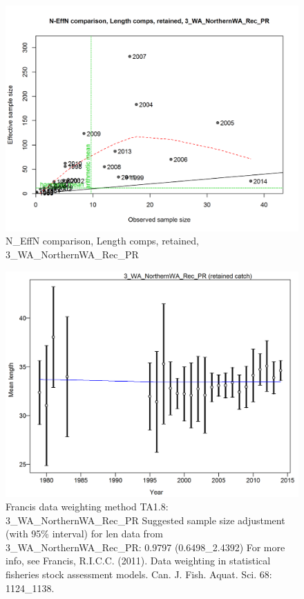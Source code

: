 \documentclass[12pt,]{article}
\begin{document}
\begin{figure}[htbp]
\centering
\includegraphics{./r4ss/plots_mod1/comp_lenfit_sampsize_flt3mkt2.png}
\caption{N\_EffN comparison, Length comps, retained,
3\_WA\_NorthernWA\_Rec\_PR
\label{fig:mod1_7_comp_lenfit_sampsize_flt3mkt2}}
\end{figure}

\begin{figure}[htbp]
\centering
\includegraphics{./r4ss/plots_mod1/comp_lenfit_data_weighting_TA1.8_3_WA_NorthernWA_Rec_PR.png}
\caption{Francis data weighting method TA1.8: 3\_WA\_NorthernWA\_Rec\_PR
Suggested sample size adjustment (with 95\% interval) for len data from
3\_WA\_NorthernWA\_Rec\_PR: 0.9797 (0.6498\_2.4392) For more info, see
Francis, R.I.C.C. (2011). Data weighting in statistical fisheries stock
assessment models. Can. J. Fish. Aquat. Sci. 68: 1124\_1138.
\label{fig:mod1_8_comp_lenfit_data_weighting_TA1.8_3_WA_NorthernWA_Rec_PR}}
\end{figure}
\end{document}
